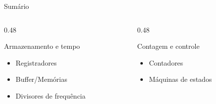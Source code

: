 
\begin{frame}{Sumário}
    \begin{columns}[T]
        \begin{column}{0.48\textwidth}
            \begin{block}{Armazenamento e tempo}
                \begin{itemize}
                    \item Registradores
                    \item Buffer/Memórias
                    \item Divisores de frequência
                \end{itemize}
            \end{block}
        \end{column}
        \begin{column}{0.48\textwidth}
            \begin{block}{Contagem e controle}
                \begin{itemize}
                    \item Contadores
                    \item Máquinas de estados
                \end{itemize}
            \end{block}
        \end{column}
    \end{columns}
\end{frame}